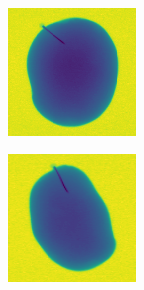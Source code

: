 \documentclass[11pt]{article}
\begin{document}
\begin{figure}[!h]
\begin{subfigure}[b]{0.22\textwidth}
         \caption{}
         \label{fig:metal_27}
     \end{subfigure}
          \\
    \begin{subfigure}[b]{0.22\textwidth}
         \centering
         \includegraphics[width=\textwidth]{figurer/potato_dataset/metal/metal_28.jpg}
         \caption{}
         \label{fig:metal_28}
     \end{subfigure}
     \hfill
     \begin{subfigure}[b]{0.22\textwidth}
         \centering
         \includegraphics[width=\textwidth]{figurer/potato_dataset/metal/metal_29.jpg}

\end{subfigure}
\end{figure}
\end{document}
